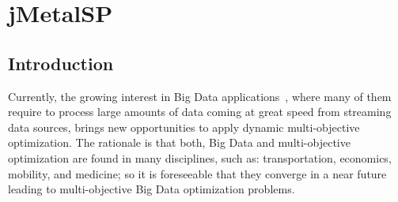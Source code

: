 \chapter{jMetalSP} %

\label{chaper:jmetalsp} %


\section{Introduction}
Currently, the growing interest in Big Data applications~\cite{BD-challenges-2014}, where many of them require to process large amounts of data coming at great speed from streaming data sources, brings new opportunities to apply dynamic multi-objective optimization. The rationale is that both, Big Data and multi-objective optimization are found in many disciplines, such as: transportation, economics,
mobility, and medicine; so it is foreseeable that they converge in a near future leading to multi-objective Big Data optimization problems. 